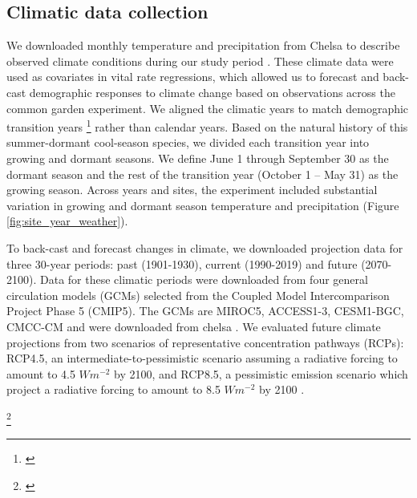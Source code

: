 \documentclass[11pt]{article}\usepackage[]{graphicx}\usepackage[usenames,dvipsnames]{xcolor}
\newcommand{\tom}[2]{{\color{red}{#1}}\footnote{\textit{\color{red}{#2}}}}
\begin{document}
\subsection*{Climatic data collection}
We downloaded monthly temperature and precipitation from Chelsa to describe observed climate conditions during our study period \citep{karger2017climatologies}.
These climate data were used as covariates in vital rate regressions, which allowed us to forecast and back-cast demographic responses to climate change based on observations across the common garden experiment. 
We aligned the climatic years to match demographic transition years \tom{(June 1 -- May 31)}{Updated with new approach.} rather than calendar years.
Based on the natural history of this summer-dormant cool-season species, we divided each transition year into growing and dormant seasons. 
We define June 1 through September 30 as the dormant season and the rest of the transition year (October 1 -- May 31) as the growing season. 
Across years and sites, the experiment included substantial variation in growing and dormant season temperature and precipitation (Figure \ref{fig:site_year_weather}).

To back-cast and forecast changes in climate, we downloaded projection data for three 30-year periods: past (1901-1930), current (1990-2019) and future (2070-2100).
Data for these climatic periods were downloaded from four general circulation models (GCMs) selected from the Coupled Model Intercomparison Project Phase 5 (CMIP5). 
The GCMs are MIROC5, ACCESS1-3, CESM1-BGC, CMCC-CM  and were downloaded from chelsa \citep{sanderson2015representative}.
We evaluated future climate projections from two scenarios of representative concentration pathways (RCPs): RCP4.5, an intermediate-to-pessimistic scenario assuming a radiative forcing to amount to 4.5 $W m^{-2}$ by 2100, and RCP8.5, a pessimistic emission scenario which project a radiative forcing to amount to 8.5 $W m^{-2}$ by 2100 \citep{thomson2011rcp4, schwalm2020rcp8}.

\tom{}{Tom stopped here during the first round of edits. Generall impressions so far: really good! Need more hypotheses regarding sex-specific responses. Also need to say a little more about prev study (including what is known about sex-specific niches), and lean into the natural history at the end of intro and start of methods.}
\end{document}
